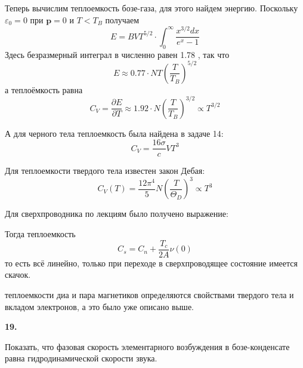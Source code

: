 \documentclass[a4paper,12pt]{article} %
\begin{document}
\begin{ttask}
Теперь вычислим теплоемкость бозе-газа, для этого найдем энергию. 
Поскольку $\varepsilon_{0}=0$ при $\mathbf{p}=0$ и $T<T_{B}$ получаем
$$
E=B V T^{5 / 2} \cdot \int_{0}^{\infty} \frac{x^{3 / 2} d x}{e^{x}-1}
$$
Здесь безразмерный интеграл в численно равен 1.78 , так что
$$
E \approx 0.77 \cdot N T\left(\frac{T}{T_{B}}\right)^{5 / 2}
$$
а теплоёмкость равна
$$
C_{V}
=
\frac{\partial E}{\partial T} 
\approx 
1.92 \cdot N\left(\frac{T}{T_{B}}\right)^{3 / 2} 
\propto 
T^{3 / 2}
$$




А для черного тела теплоемкость была найдена в задаче 14:
$$
C_{V}=\frac{16 \sigma}{c} V T^{3}
$$





Для теплоемкости твердого тела известен закон Дебая:
$$
C_{V}(T)=\frac{12 \pi^{4}}{5} N\left(\frac{T}{\Theta_{D}}\right)^{3} \propto T^{3}
$$



Для сверхпроводника по лекциям было получено выражение:

Тогда теплоемкость
$$
C_{s}
=
C_{n}+\frac{T_{c}}{2 A} \nu(0)
$$
то есть всё линейно, только при переходе в сверхпроводящее состояние имеется скачок.




теплоемкости диа и пара магнетиков определяются свойствами твердого тела и вкладом электронов, 
а это было уже описано выше.











\end{ttask}






\begin{ttask} \textbf{19.}
	 
Показать, что фазовая скорость элементарного возбуждения в бозе-конденсате равна гидродинамической скорости звука.


















\end{ttask}
\end{document}
